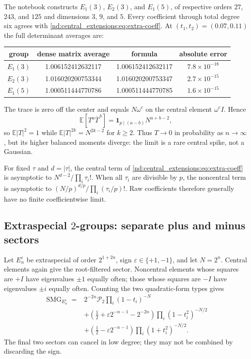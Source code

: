 \documentclass[10pt]{article}
\newcommand{\SMG}{\operatorname{SMG}}
\newcommand{\MGF}{\SMG}
\newcommand{\PP}{\mathcal P}
\begin{document}
The notebook constructs $E_1(3)$, $E_2(3)$, and $E_1(5)$, of respective
orders $27$, $243$, and $125$ and dimensions $3$, $9$, and $5$.  Every
coefficient through total degree six agrees with \eqref{nd:central_extensions:eq:extra-coeff}.
At $(t_1,t_2)=(0.07,0.11)$ the full determinant averages are:
\begin{center}
\begin{tabular}{@{}c c c c@{}}
\toprule
group & dense matrix average & formula & absolute error\\
\midrule
$E_1(3)$ & 1.006152412632117 & 1.006152412632117 & $7.8\times10^{-18}$\\
$E_2(3)$ & 1.016020200753344 & 1.016020200753347 & $2.7\times10^{-15}$\\
$E_1(5)$ & 1.000511444770786 & 1.000511444770785 & $1.6\times10^{-15}$\\
\bottomrule
\end{tabular}
\end{center}

The trace is zero off the center and equals $N\omega^c$ on the central
element $\omega^cI$.  Hence
\begin{equation}\label{nd:central_extensions:eq:trace-spike}
 \mathbb E[T^a\overline T^{\,b}]
 =\mathbf1_{p\mid(a-b)}N^{a+b-2},
\end{equation}
so $\mathbb E|T|^2=1$ while
$\mathbb E|T|^{2k}=N^{2k-2}$ for $k\geq2$.  Thus $T\to0$ in probability
as $n\to\infty$, but its higher balanced moments diverge: the limit is a
rare central spike, not a Gaussian.

For fixed $\tau$ and $d=|\tau|$, the central term of
\eqref{nd:central_extensions:eq:extra-coeff} is asymptotic to
$N^{d-2}/\prod_i\tau_i!$.  When all $\tau_i$ are divisible by $p$, the
noncentral term is asymptotic to
$(N/p)^{d/p}/\prod_i(\tau_i/p)!$.  Raw coefficients therefore generally
have no finite coefficientwise limit.

\subsection{Extraspecial \texorpdfstring{$2$}{2}-groups: separate plus and minus sectors}

Let $E_n^\varepsilon$ be extraspecial of order $2^{1+2n}$, sign
$\varepsilon\in\{+1,-1\}$, and let $N=2^n$.  Central elements again give
the root-filtered sector.  Noncentral elements whose squares are $+I$ have
eigenvalues $\pm1$ equally often; those whose squares are $-I$ have
eigenvalues $\pm i$ equally often.  Counting the two quadratic-form types
gives
\begin{equation}\label{nd:central_extensions:eq:extra-two}
 \boxed{\begin{aligned}
 \MGF_{E_n^\varepsilon}={}&
 2^{-2n}\PP_2\prod_i(1-t_i)^{-N}\\
 &+\left(\frac12+\varepsilon2^{-n-1}-2^{-2n}\right)
       \prod_i(1-t_i^2)^{-N/2}\\
 &+\left(\frac12-\varepsilon2^{-n-1}\right)
       \prod_i(1+t_i^2)^{-N/2}.
 \end{aligned}}
\end{equation}
The final two sectors can cancel in low degree; they may not be combined by
discarding the sign.
\end{document}
